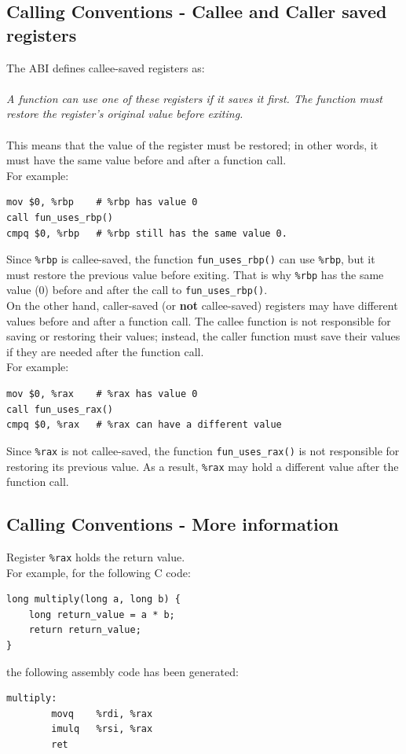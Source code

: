 \documentclass{article}
\begin{document}
\subsection{Calling Conventions - Callee and Caller saved registers}
\label{sec: calle-caller-regs}
%
The ABI defines callee-saved registers as: \\
\\
%
\textit{A function can use one of these registers if it saves it first. The function must restore the register’s original value before exiting.} \\
\\
%
This means that the value of the register must be restored; in other words, it must have the same value before and after a function call. \\
%
\noindent For example:
\begin{verbatim}
mov $0, %rbp    # %rbp has value 0
call fun_uses_rbp()
cmpq $0, %rbp   # %rbp still has the same value 0.
\end{verbatim}
%
Since \texttt{\%rbp} is callee-saved, the function \texttt{fun\_uses\_rbp()} can use \texttt{\%rbp}, but it must restore the previous value before exiting. That is why \texttt{\%rbp} has the same value (0) before and after the call to \texttt{fun\_uses\_rbp()}. \\
%
On the other hand, caller-saved (or \textbf{not} callee-saved) registers may have different values before and after a function call. The callee function is not responsible for saving or restoring their values; instead, the caller function must save their values if they are needed after the function call. \\
%
\noindent For example:
\begin{verbatim}
mov $0, %rax    # %rax has value 0
call fun_uses_rax()
cmpq $0, %rax   # %rax can have a different value 
\end{verbatim}
%
Since \texttt{\%rax} is not callee-saved, the function \texttt{fun\_uses\_rax()} is not responsible for restoring its previous value. As a result, \texttt{\%rax} may hold a different value after the function call.
%
\subsection{Calling Conventions - More information}
Register \texttt{\%rax} holds the return value. \\
\noindent For example, for the following C code:
\begin{verbatim}
long multiply(long a, long b) {
    long return_value = a * b;
    return return_value;
}
\end{verbatim}
\noindent the following assembly code has been generated:
\begin{verbatim}
multiply:
        movq    %rdi, %rax
        imulq   %rsi, %rax
        ret
\end{verbatim}
\end{document}
